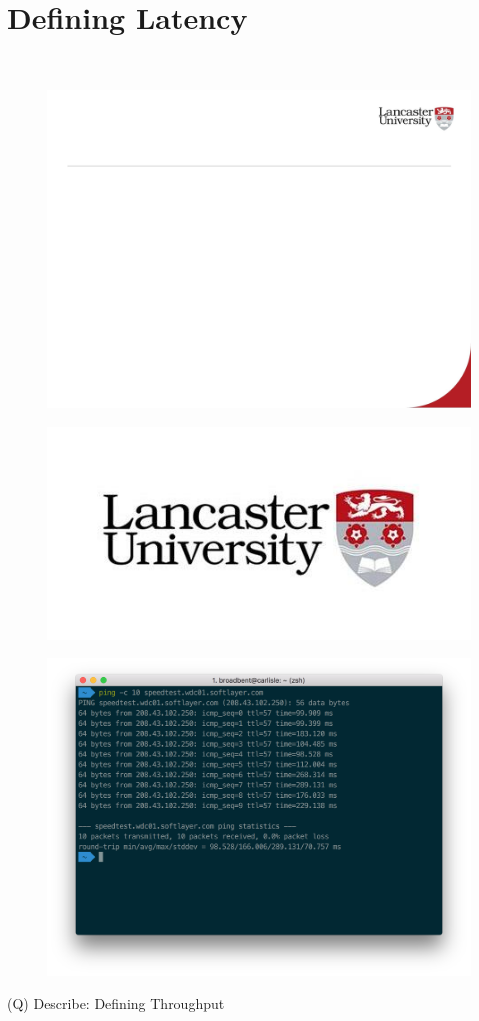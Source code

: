 \documentclass[12pt]{article}
\begin{document}
\section{Defining Latency}
\\
\begin{figure}[H]
\includegraphics[width=0.5\linewidth]{page28-image-1.png}
\end{figure}
\begin{figure}[H]
\includegraphics[width=0.5\linewidth]{page28-image-2.png}
\end{figure}
\begin{figure}[H]
\includegraphics[width=0.5\linewidth]{page28-image-3.png}
\end{figure}
\clearpage
(Q)
Describe: Defining Throughput
\clearpage
\end{document}
